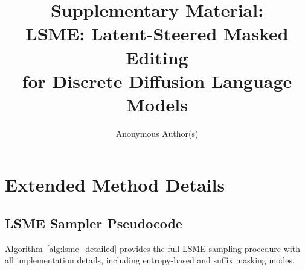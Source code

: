\documentclass{article}
\title{Supplementary Material:\\LSME: Latent-Steered Masked Editing\\for Discrete Diffusion Language Models}
\author{Anonymous Author(s)}
\begin{document}
\maketitle

\setcounter{section}{0}
\renewcommand{\thesection}{\Alph{section}}

\section{Extended Method Details}
\label{app:method_details}

\subsection{LSME Sampler Pseudocode}

Algorithm~\ref{alg:lsme_detailed} provides the full LSME sampling procedure with all implementation details, including entropy-based and suffix masking modes.
\end{document}
